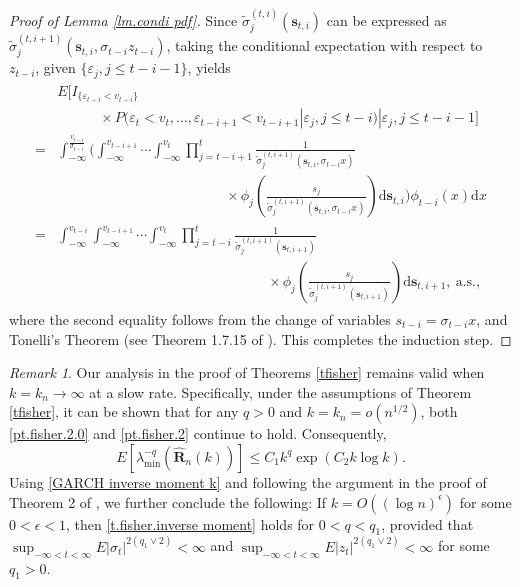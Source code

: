 \documentclass[ejsv2]{imsart}
\theoremstyle{plain}
\theoremstyle{definition}
\theoremstyle{remark}
\newtheorem{remark}{Remark}[section]
\begin{document}
\begin{proof}[Proof of Lemma \ref{lm.condi pdf}]
  Since
$\tilde{\sigma}^{(t,i)}_j(\mathbf{s}_{t,i})$
can be expressed as
$\tilde{\sigma}^{(t,i+1)}_j(\mathbf{s}_{t,i},\sigma_{t-i}z_{t-i})$, 
taking the conditional expectation with respect to $z_{t-i}$, given $\{\varepsilon_{j},j\leq t-i-1\}$, yields
\begin{align}\label{p.lm.condi pdf.4}
\begin{split}
     & E[I_{\{\varepsilon_{t-i}<v_{t-i}\}}\\
     &\hspace{3em}\times P(\varepsilon_t<v_t,\ldots,\varepsilon_{t-i+1}<v_{t-i+1}|\varepsilon_{j},j\leq t-i)|\varepsilon_{j},j\leq t-i-1]\\
     =& \int_{-\infty}^{\frac{v_{t-i}}{\sigma_{t-i}}}\bigg(\int_{-\infty}^{v_{t-i+1}}\cdots\int_{-\infty}^{v_t}\prod_{j=t-i+1}^{t}\frac{1}{{\tilde{\sigma}}^{(t,i+1)}_{j}({\mathbf{s}}_{t,i},\sigma_{t-i}x)}\\
     &\hspace{12em}\times \phi_{j}(\frac{{s}_j}{{\tilde{\sigma}}^{(t,i+1)}_{j}({\mathbf{s}}_{t,i},\sigma_{t-i}x)})\mathrm{d}{\mathbf{s}}_{t,i}\bigg)\phi_{t-i}(x)\mathrm{d}x\\
    = & \int_{-\infty}^{v_{t-i}}\int_{-\infty}^{v_{t-i+1}}\cdots\int_{-\infty}^{v_t}\prod_{j=t-i}^{t}\frac{1}{\tilde{\sigma}^{(t,i+1)}_{j}({\mathbf{s}_{t,i+1}})}\\
    &\hspace{15em}\times \phi_{j}(\frac{{s}_j}{\tilde{\sigma}^{(t,i+1)}_{j}({\mathbf{s}_{t,i+1}})})\mathrm{d}{\mathbf{s}_{t,i+1}},\ \textrm{a.s.,}
\end{split}
\end{align}
where the second equality follows from the change of variables $s_{t-i}=\sigma_{t-i}x$,
and Tonelli's Theorem
(see Theorem 1.7.15 of \cite{Tao21}). This completes the induction step.
\end{proof}

\begin{remark}\label{rm2.2}
Our analysis in the proof of Theorems \ref{tfisher} remains valid when $k=k_n\to\infty$ at a slow rate. Specifically, under the assumptions of Theorem \ref{tfisher}, it can be shown that for any $q>0$ and $k=k_n= o(n^{1/2})$, both
\eqref{pt.fisher.2.0} and \eqref{pt.fisher.2}
continue to hold. Consequently,
\begin{equation}\label{GARCH inverse moment k}
E[\lambda_{\min}^{-q}(\hat{\mathbf{R}}_n(k))]\leq C_{1}k^{q}\exp({C_{2}k\log k}).
\end{equation}
Using \eqref{GARCH inverse moment k} and
following the argument in the proof of Theorem 2 of
\cite{Ing2003}, 
we further conclude the following: If $k=O((\log n)^\epsilon)$ for some $0<\epsilon<1$, then
\eqref{t.fisher.inverse moment} holds for $0<q<q_1$, provided that $\sup_{-\infty<t<\infty}E|\sigma_t|^{2(q_1\vee2)}<\infty$ and $\sup_{-\infty<t<\infty}E|z_t|^{2(q_1\vee2)}<\infty$ for some $q_1>0$. 
\end{remark}
\end{document}
